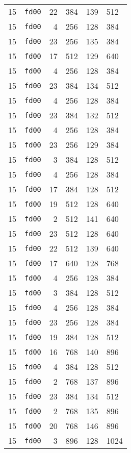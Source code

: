 \documentclass{article}
\begin{document}
\begin{table}[h!]
\begin{tabular}{llrrrl}
    15 & \texttt{fd00} & 22 & 384 & 139 & 512 \\
    15 & \texttt{fd00} & 4 & 256 & 128 & 384 \\
    15 & \texttt{fd00} & 23 & 256 & 135 & 384 \\
    15 & \texttt{fd00} & 17 & 512 & 129 & 640 \\
    15 & \texttt{fd00} & 4 & 256 & 128 & 384 \\
    15 & \texttt{fd00} & 23 & 384 & 134 & 512 \\
    15 & \texttt{fd00} & 4 & 256 & 128 & 384 \\
    15 & \texttt{fd00} & 23 & 384 & 132 & 512 \\
    15 & \texttt{fd00} & 4 & 256 & 128 & 384 \\
    15 & \texttt{fd00} & 23 & 256 & 129 & 384 \\
    15 & \texttt{fd00} & 3 & 384 & 128 & 512 \\
    15 & \texttt{fd00} & 4 & 256 & 128 & 384 \\
    15 & \texttt{fd00} & 17 & 384 & 128 & 512 \\
    15 & \texttt{fd00} & 19 & 512 & 128 & 640 \\
    15 & \texttt{fd00} & 2 & 512 & 141 & 640 \\
    15 & \texttt{fd00} & 23 & 512 & 128 & 640 \\
    15 & \texttt{fd00} & 22 & 512 & 139 & 640 \\
    15 & \texttt{fd00} & 17 & 640 & 128 & 768 \\
    15 & \texttt{fd00} & 4 & 256 & 128 & 384 \\
    15 & \texttt{fd00} & 3 & 384 & 128 & 512 \\
    15 & \texttt{fd00} & 4 & 256 & 128 & 384 \\
    15 & \texttt{fd00} & 23 & 256 & 128 & 384 \\
    15 & \texttt{fd00} & 19 & 384 & 128 & 512 \\
    15 & \texttt{fd00} & 16 & 768 & 140 & 896 \\
    15 & \texttt{fd00} & 4 & 384 & 128 & 512 \\
    15 & \texttt{fd00} & 2 & 768 & 137 & 896 \\
    15 & \texttt{fd00} & 23 & 384 & 134 & 512 \\
    15 & \texttt{fd00} & 2 & 768 & 135 & 896 \\
    15 & \texttt{fd00} & 20 & 768 & 146 & 896 \\
    15 & \texttt{fd00} & 3 & 896 & 128 & 1024 \\

\end{tabular}
\end{table}
\end{document}
